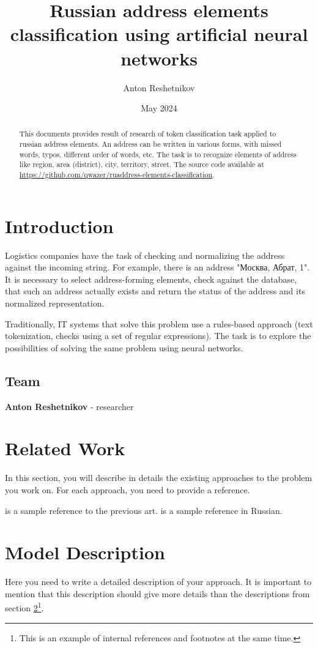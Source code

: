 \documentclass{article}
\title{Russian address elements classification using artificial neural networks}
\author{Anton Reshetnikov}
\date{May 2024}
\begin{document}
\maketitle
\begin{abstract}
    This documents provides result of research of token classification task applied to russian address elements.
    An address can be written in various forms, with missed words, typos, different order of words, etc.
    The task is to recognize elements of address like region, area (district), city, territory, street.
    The source code available at
     \url{https://github.com/qwazer/ruaddress-elements-classification}.
\end{abstract}



\section{Introduction}

Logistics companies have the task of checking and normalizing the address against the incoming string.
For example, there is an address "Москва, Абрат, 1".
It is necessary to select address-forming elements, check against the database,
that such an address actually exists and return the status of the address and its normalized representation.

Traditionally, IT systems that solve this problem use a rules-based approach (text tokenization, checks using a set of regular expressions).
The task is to explore the possibilities of solving the same problem using neural networks.

\subsection{Team}

\textbf{Anton Reshetnikov} - researcher



\section{Related Work}
\label{sec:related}
In this section, you will describe in details the existing approaches to the problem you work on. For each approach, you need to provide a reference.

\cite{levenshtein1966dvoichnie} is a sample reference to the previous art. \cite{levenshtein1966dvoichnie} is a sample reference in Russian.

\section{Model Description}
Here you need to write a detailed description of your approach.
It is important to mention that this description should give more details than the descriptions from section \ref{sec:related}\footnote{This is an example of internal references and footnotes at the same time.}.
\end{document}
